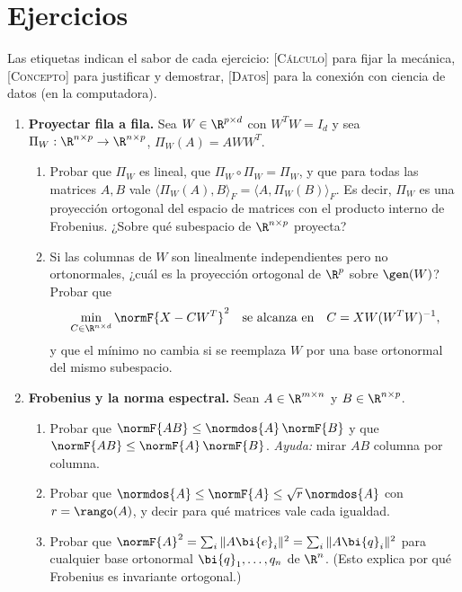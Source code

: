 \section*{Ejercicios}

\noindent\footnotesize Las etiquetas indican el sabor de cada ejercicio:
\textsc{[Cálculo]} para fijar la mecánica, \textsc{[Concepto]} para
justificar y demostrar, \textsc{[Datos]} para la conexión con ciencia de
datos (en la computadora).\normalsize

\begin{enumerate}[leftmargin=*,label=\textbf{\thechapter.\arabic*},ref=\thechapter.\arabic*,itemsep=4pt]

\item {} \textbf{Proyectar fila a fila.}\label{pca-ej:proyectar} Sea $W\in\R^{p\times d}$
con $W^T W=I_d$ y sea $\Pi_W:\R^{n\times p}\to\R^{n\times p}$,
$\Pi_W(A)=AWW^T$.
\begin{enumerate}[label=(\alph*)]
\item Probar que $\Pi_W$ es lineal, que $\Pi_W\circ\Pi_W=\Pi_W$, y que para
todas las matrices $A,B$ vale
$\langle\Pi_W(A),B\rangle_F=\langle A,\Pi_W(B)\rangle_F$. Es decir, $\Pi_W$
es una proyección ortogonal del espacio de matrices con el producto interno
de Frobenius. ¿Sobre qué subespacio de $\R^{n\times p}$ proyecta?
\item Si las columnas de $W$ son linealmente independientes pero no
ortonormales, ¿cuál es la proyección ortogonal de $\R^p$ sobre $\gen(W)$?
Probar que
\[
\min_{C\in\R^{n\times d}}\normF{X-CW^T}^2
\quad\text{se alcanza en}\quad C=XW(W^T W)^{-1},
\]
y que el mínimo no cambia si se reemplaza $W$ por una base ortonormal del
mismo subespacio.
\end{enumerate}

\item {} \textbf{Frobenius y la norma espectral.} Sean
$A\in\R^{m\times n}$ y $B\in\R^{n\times p}$.
\begin{enumerate}[label=(\alph*)]
\item Probar que $\normF{AB}\le\normdos{A}\,\normF{B}$ y que
$\normF{AB}\le\normF{A}\,\normF{B}$. \emph{Ayuda:} mirar $AB$ columna por
columna.
\item Probar que $\normdos{A}\le\normF{A}\le\sqrt{r}\,\normdos{A}$ con
$r=\rango(A)$, y decir para qué matrices vale cada igualdad.
\item Probar que $\normF{A}^2=\sum_i\|A\bi{e}_i\|^2=\sum_i\|A\bi{q}_i\|^2$ para cualquier
base ortonormal $\bi{q}_1,\dots,q_n$ de $\R^n$. (Esto explica por qué Frobenius es
invariante ortogonal.)
\end{enumerate}


\end{enumerate}
